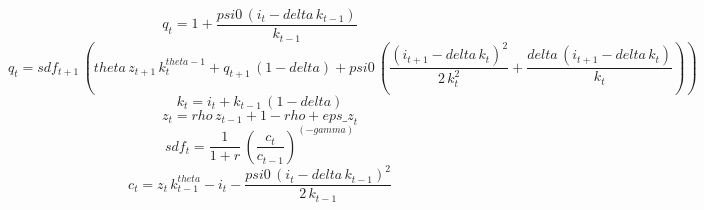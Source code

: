 \begin{dmath}
{q}_{t}=1+\frac{{psi0}\, \left({i}_{t}-{delta}\, {k}_{t-1}\right)}{{k}_{t-1}}
\end{dmath}
\begin{dmath}
{q}_{t}={sdf}_{t+1}\, \left({theta}\, {z}_{t+1}\, {k}_{t}^{{theta}-1}+{q}_{t+1}\, \left(1-{delta}\right)+{psi0}\, \left(\frac{\left({i}_{t+1}-{delta}\, {k}_{t}\right)^{2}}{2\, {k}_{t}^{2}}+\frac{{delta}\, \left({i}_{t+1}-{delta}\, {k}_{t}\right)}{{k}_{t}}\right)\right)
\end{dmath}
\begin{dmath}
{k}_{t}={i}_{t}+{k}_{t-1}\, \left(1-{delta}\right)
\end{dmath}
\begin{dmath}
{z}_{t}={rho}\, {z}_{t-1}+1-{rho}+{eps\_z}_{t}
\end{dmath}
\begin{dmath}
{sdf}_{t}=\frac{1}{1+{r}}\, \left(\frac{{c}_{t}}{{c}_{t-1}}\right)^{\left(-{gamma}\right)}
\end{dmath}
\begin{dmath}
{c}_{t}={z}_{t}\, {k}_{t-1}^{{theta}}-{i}_{t}-\frac{{psi0}\, \left({i}_{t}-{delta}\, {k}_{t-1}\right)^{2}}{2\, {k}_{t-1}}
\end{dmath}
